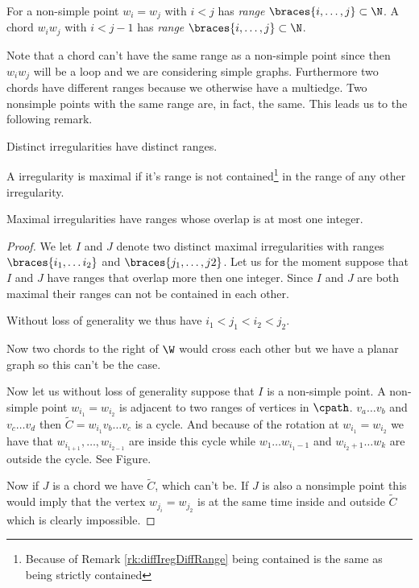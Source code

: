   \begin{defi}
  For a non-simple point  $w_i = w_j$ with $i<j$ has \emph{range} $\braces{i, \ldots, j} \subset \N$.
  A chord $w_i w_j$ with $i< j-1$ has \emph{range} $\braces{i, \ldots, j} \subset \N$.
  \end{defi}

  Note that a chord can't have the same range as a non-simple point since then $w_i w_j$ will be a loop and we are considering simple graphs. Furthermore two chords have different ranges because we otherwise have a multiedge. Two nonsimple points with the same range are, in fact, the same. This leads us to the following remark.
  \begin{remark}
  \label{rk:diffIregDiffRange}
  Distinct irregularities have distinct ranges.
  \end{remark}

  \begin{defi}
  A irregularity is maximal if it's range is not contained\footnote{Because of Remark \ref{rk:diffIregDiffRange} being contained is the same as being strictly contained} in the range of any other irregularity.
  \end{defi}

  \begin{lemma}
  \label{lm:rangeOverlap}
  Maximal irregularities have ranges whose overlap is at most one integer.
  \end{lemma}
  \begin{proof}
  We let $I$ and $J$ denote two distinct maximal irregularities with ranges $\braces{i_1, \ldots i_2}$ and $\braces{j_1, \ldots, j2}$. Let us for the moment suppose that $I$ and $J$ have ranges that overlap more then one integer. Since $I$ and $J$ are both maximal their ranges can not be contained in each other.

  Without loss of generality we thus have $i_1 < j_1 < i_2 < j_2$.

  Now two chords to the right of $\W$ would cross each other but we have a planar graph so this can't be the case.

  Now let us without loss of generality suppose that $I$ is a non-simple point. A non-simple point $w_{i_1} = w_{i_2}$ is adjacent to two ranges of vertices in $\cpath$. $v_a \ldots v_b$ and $v_c \ldots v_d$
  then $\tilde{C} = w_{i_1} v_b \ldots v_c$ is a cycle. And because of the rotation at $w_{i_1} = w_{i_2}$ we have that $w_{i_{1 +1}}, \ldots, w_{i_{2 -1}}$ are inside this cycle while $w_1 \ldots w_{i_1 -1}$ and $ w_{i_2 +1} \ldots w_k$ are outside the cycle. See Figure.

  Now if $J$ is a chord we have $\tilde{C}$, which can't be. If $J$ is also a nonsimple point this would imply that the vertex $w_{j_i} = w_{j_2}$ is at the same time inside and outside $\tilde{C}$ which is clearly impossible.
  \end{proof}

